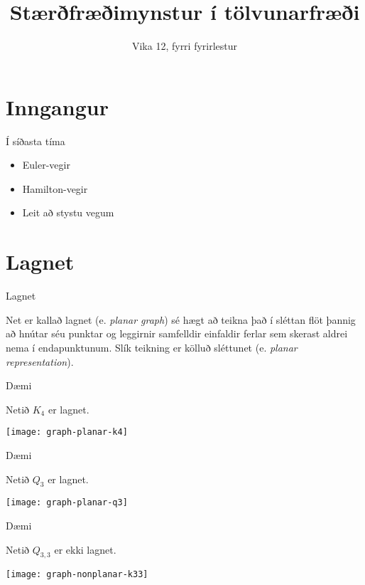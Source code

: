 \documentclass[handout]{beamer}
\title{Stærðfræðimynstur í tölvunarfræði}
\subtitle{Vika 12, fyrri fyrirlestur}
\begin{document}
\begin{frame}
\titlepage
\end{frame}


\section{Inngangur}

\begin{frame}{Í síðasta tíma}
\begin{itemize}
 \item Euler-vegir
 \item Hamilton-vegir
 \item Leit að stystu vegum
\end{itemize}
\end{frame}

\section{Lagnet}

\begin{frame}{Lagnet}
\begin{tcolorbox}[title=Lagnet]
Net er kallað lagnet (e. \emph{planar graph}) sé hægt að teikna það í sléttan flöt þannig að hnútar séu punktar og leggirnir samfelldir einfaldir ferlar sem skerast aldrei nema í endapunktunum. Slík teikning er kölluð sléttunet (e. \emph{planar representation}).
\end{tcolorbox}
\end{frame}

\begin{frame}{Dæmi}
\begin{center}
Netið $K_4$ er lagnet.

\texttt{[image: graph-planar-k4]}
\end{center}
\end{frame}

\begin{frame}{Dæmi}
\begin{center}
Netið $Q_3$ er lagnet.

\texttt{[image: graph-planar-q3]}
\end{center}
\end{frame}

\begin{frame}{Dæmi}
\begin{center}
Netið $Q_{3,3}$ er ekki lagnet.

\texttt{[image: graph-nonplanar-k33]}
\end{center}
\end{frame}
\end{document}

